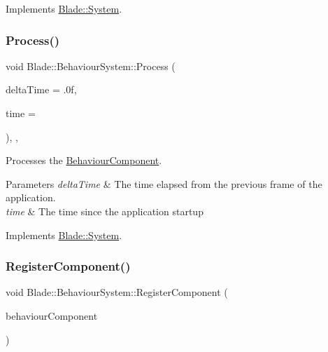 Implements \hyperlink{class_blade_1_1_system_a63fa00af40dc54d093300eff4785f26f}{Blade\+::\+System}.

\mbox{\label{class_blade_1_1_behaviour_system_af233e62b0ee7a43a419069d6de557343}} 
\subsubsection{\texorpdfstring{Process()}{Process()}}
{\footnotesize\ttfamily void Blade\+::\+Behaviour\+System\+::\+Process (\begin{DoxyParamCaption}\item[{float}]{delta\+Time = {\ttfamily .0f},  }\item[{long}]{time = {} }\end{DoxyParamCaption})\hspace{0.3cm}{\ttfamily [override]}, {\ttfamily [virtual]}, {\ttfamily [noexcept]}}



Processes the \hyperlink{class_blade_1_1_behaviour_component}{Behaviour\+Component}. 


\begin{DoxyParams}{Parameters}
{\em delta\+Time} & The time elapsed from the previous frame of the application. \\
\hline
{\em time} & The time since the application startup \\
\hline
\end{DoxyParams}


Implements \hyperlink{class_blade_1_1_system_a80c186f5f9f8fa4fd317b861853fe6a8}{Blade\+::\+System}.

\mbox{\label{class_blade_1_1_behaviour_system_aafcc2463979e3442abb93c086b4d0cbc}} 
\subsubsection{\texorpdfstring{Register\+Component()}{RegisterComponent()}}
{\footnotesize\ttfamily void Blade\+::\+Behaviour\+System\+::\+Register\+Component (\begin{DoxyParamCaption}\item[{\hyperlink{class_blade_1_1_behaviour_component}{Behaviour\+Component} $\ast$}]{behaviour\+Component }\end{DoxyParamCaption})\hspace{0.3cm}{\ttfamily [noexcept]}}



